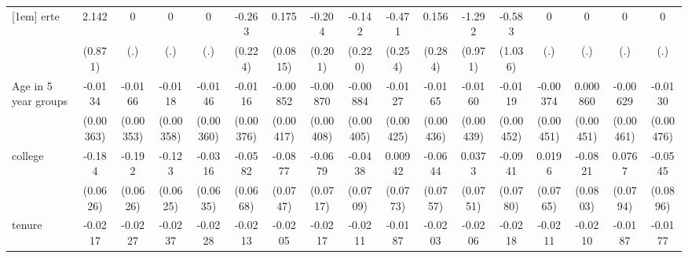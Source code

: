 {\begin{tabular}{l*{16}{c}}
[1em]
erte                &       2.142\sym{*}  &           0         &           0         &           0         &      -0.263         &       0.175\sym{*}  &      -0.204         &      -0.142         &      -0.471         &       0.156         &      -1.292         &      -0.583         &           0         &           0         &           0         &           0         \\
                    &     (0.871)         &         (.)         &         (.)         &         (.)         &     (0.224)         &    (0.0815)         &     (0.201)         &     (0.220)         &     (0.254)         &     (0.284)         &     (0.971)         &     (1.036)         &         (.)         &         (.)         &         (.)         &         (.)         \\
[1em]
Age in 5 year groups&     -0.0134\sym{***}&     -0.0166\sym{***}&     -0.0118\sym{***}&     -0.0146\sym{***}&     -0.0116\sym{**} &    -0.00852\sym{*}  &    -0.00870\sym{*}  &    -0.00884\sym{*}  &     -0.0127\sym{**} &     -0.0165\sym{***}&     -0.0160\sym{***}&     -0.0119\sym{**} &    -0.00374         &    0.000860         &    -0.00629         &     -0.0130\sym{**} \\
                    &   (0.00363)         &   (0.00353)         &   (0.00358)         &   (0.00360)         &   (0.00376)         &   (0.00417)         &   (0.00408)         &   (0.00405)         &   (0.00425)         &   (0.00436)         &   (0.00439)         &   (0.00452)         &   (0.00451)         &   (0.00451)         &   (0.00461)         &   (0.00476)         \\
[1em]
college             &      -0.184\sym{**} &      -0.192\sym{**} &      -0.123\sym{*}  &     -0.0316         &     -0.0582         &     -0.0877         &     -0.0679         &     -0.0438         &     0.00942         &     -0.0644         &      0.0373         &     -0.0941         &      0.0196         &     -0.0821         &      0.0767         &     -0.0545         \\
                    &    (0.0626)         &    (0.0626)         &    (0.0625)         &    (0.0635)         &    (0.0668)         &    (0.0747)         &    (0.0717)         &    (0.0709)         &    (0.0773)         &    (0.0757)         &    (0.0751)         &    (0.0780)         &    (0.0765)         &    (0.0803)         &    (0.0794)         &    (0.0896)         \\
[1em]
tenure              &     -0.0217\sym{***}&     -0.0227\sym{***}&     -0.0237\sym{***}&     -0.0228\sym{***}&     -0.0213\sym{***}&     -0.0205\sym{***}&     -0.0217\sym{***}&     -0.0211\sym{***}&     -0.0187\sym{***}&     -0.0203\sym{***}&     -0.0206\sym{***}&     -0.0218\sym{***}&     -0.0211\sym{***}&     -0.0210\sym{***}&     -0.0187\sym{***}&     -0.0177\sym{***}\\

\end{tabular}}

